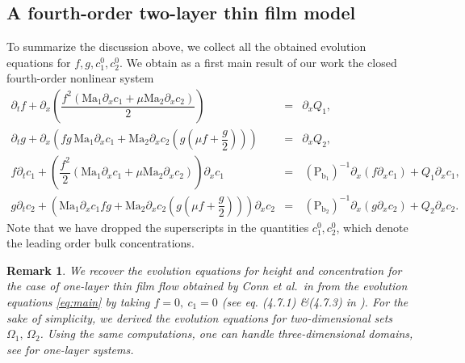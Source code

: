 \documentclass[11pt]{article}
\numberwithin{equation}{section}
\newtheorem{counter example}[theorem]{Counter Example}
\newtheorem{remark}[theorem] {Remark}
\begin{document}
{\subsection{A fourth-order  two-layer thin film model}\label{subsec:fourth}
To summarize the discussion above, we collect all the obtained evolution equations  for $f,g,c^0_1,c^0_2$. We obtain as a first main result of our work  the closed fourth-order nonlinear system
\begin{equation}\label{eq:main}
\begin{array}{rcl}
  \partial_t f
  +\partial_x \left(\dfrac{f^2(\mathrm{Ma_1} \partial_x c_1+\mu \mathrm{Ma_2}\partial_x c_2)}{2}\right)
  &=&\partial_x Q_1,%
  \\[1.9ex]
%
\partial_t g
  +\partial_x\left(
      fg\,\mathrm{Ma_1} \partial_x c_1
      +\mathrm{Ma_2}\partial_x c_2\left(g\left(\mu f+\dfrac{g}{2}\right)\right)
    \right)
  &=&\partial_x Q_2,%
  \\[1.5ex]
%
  f\partial_t c_1
  +\left(\dfrac{f^2}{2}
      \left(\mathrm{Ma_1} \partial_x c_1+\mu \mathrm{Ma_2}\partial_x c_2\right)\right)\partial_x c_1 %
      
  & =& \, (\mathrm{P_{b_1}})^{-1}\partial_x(f\partial_x c_1)
      +Q_1 \partial_x c_1,%
      \\[1.9ex]
%
g\partial_t c_2
  +\left(
      \mathrm{Ma_1} \partial_x c_1fg
      +\mathrm{Ma_2}\partial_x c_2\left(g\left(\mu f+\dfrac{g}{2}\right)\right)
    \right)\partial_x c_2%
 
  &
   =&\,(\mathrm{P_{b_2}})^{-1}\partial_x\left(g\partial_x c_2\right)
      +Q_2 \partial_x c_2. %
\end{array}
\end{equation}
Note that we have dropped the superscripts in the quantities $c_1^0,c^0_2$, which denote the leading order bulk concentrations.


\begin{remark}
We recover the evolution equations for height and concentration for the case of one-layer thin film flow obtained by Conn et al.~in \cite{conn2017stability} from the evolution equations \eqref{eq:main} by taking $f=0, ~c_1=0$  (see eq. (4.7.1) \&(4.7.3) in \cite{conn2017stability}).
For the sake of simplicity, we derived the evolution equations for two-dimensional sets $\Omega_1,\, \Omega_2$. Using the same computations, one can handle three-dimensional domains, see \cite{barthwal2023construction} for one-layer systems.
\end{remark}

}
\end{document}
